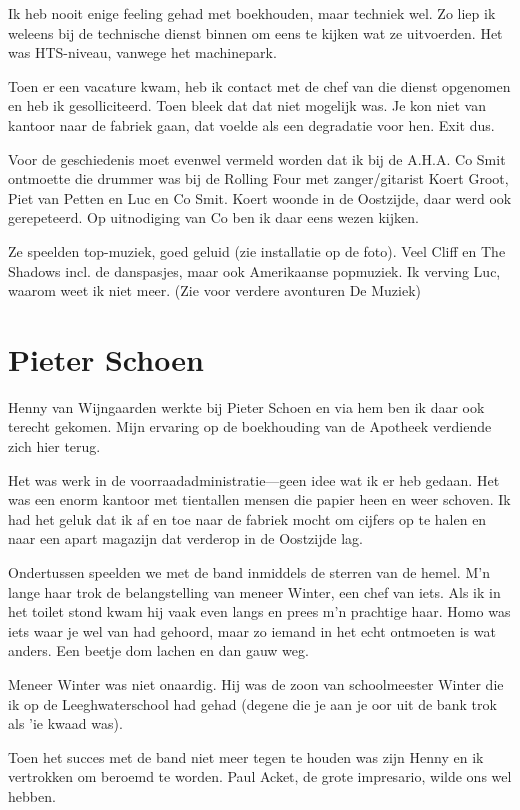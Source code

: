 \documentclass[12pt,twoside]{memoir}
\begin{document}
Ik heb nooit enige feeling gehad met boekhouden, maar techniek wel. Zo liep ik weleens bij de technische dienst binnen om eens te kijken wat ze uitvoerden. Het was HTS-niveau, vanwege het machinepark. 

Toen er een vacature kwam, heb ik contact met de chef van die dienst opgenomen en heb ik gesolliciteerd. Toen bleek dat dat niet mogelijk was. Je kon niet van kantoor naar de fabriek gaan, dat voelde als een degradatie voor hen. Exit dus.

Voor de geschiedenis moet evenwel vermeld worden dat ik bij de A.H.A. Co Smit ontmoette die drummer was bij de Rolling Four met zanger/gitarist Koert Groot, Piet van Petten en Luc en Co Smit. Koert woonde in de Oostzijde, daar werd ook gerepeteerd. Op uitnodiging van Co ben ik daar eens wezen kijken. 

Ze speelden top-muziek, goed geluid (zie installatie op de foto). Veel Cliff en The Shadows incl. de danspasjes, maar ook Amerikaanse popmuziek. Ik verving Luc, waarom weet ik niet meer. (Zie voor verdere avonturen De Muziek)

\chapter{Pieter Schoen} %
\label{cha:schoen}

Henny van Wijngaarden werkte bij Pieter Schoen en via hem ben ik daar ook terecht gekomen. Mijn ervaring op de boekhouding van de Apotheek verdiende zich hier terug.

Het was werk in de voorraadadministratie---geen idee wat ik er heb gedaan. Het was een enorm kantoor met tientallen mensen die papier heen en weer schoven. Ik had het geluk dat ik af en toe naar de fabriek mocht om cijfers op te halen en naar een apart magazijn dat verderop in de Oostzijde lag. 

Ondertussen speelden we met de band inmiddels de sterren van de hemel. M’n lange haar trok de belangstelling van meneer Winter, een chef van iets. Als ik in het toilet stond kwam hij vaak even langs en prees m’n prachtige haar. Homo was iets waar je wel van had gehoord, maar zo iemand in het echt ontmoeten is wat anders. Een beetje dom lachen en dan gauw weg. 

Meneer Winter was niet onaardig. Hij was de zoon van schoolmeester Winter die ik op de Leeghwaterschool had gehad (degene die je aan je oor uit de bank trok als 'ie kwaad was). 

Toen het succes met de band niet meer tegen te houden was zijn Henny en ik vertrokken om beroemd te worden. Paul Acket, de grote impresario, wilde ons wel hebben.
\end{document}
